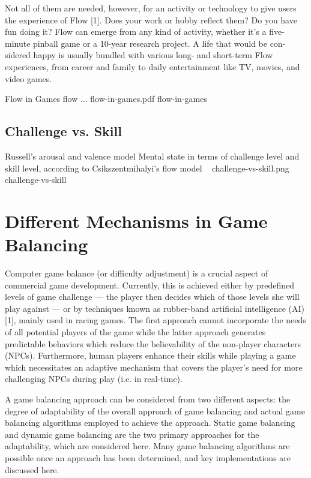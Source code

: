 \documentclass{uofsthesis-cs}
\begin{document}
 Not all of them are needed, however, for an activity or technology to give users the experience of Flow [1]. Does your work or hobby reflect them? Do you have fun doing it? Flow can emerge from any kind of activity, whether it’s a five-minute pinball game or a 10-year research project. A life that would be con- sidered happy is usually bundled with various long- and short-term Flow experiences, from career and family to daily entertainment like TV, movies, and video games. 

\img
{Flow in Games}
{flow ...}
{flow-in-games.pdf}
{flow-in-games}

\subsection{Challenge vs. Skill}

\img
{Russell's arousal and valence model}
{Mental state in terms of challenge level and skill level, according to Csikszentmihalyi's flow model ~\cite{csikszentmihalyi1997finding}}
{challenge-vs-skill.png}
{challenge-vs-skill}


\section{Different Mechanisms in Game Balancing}

Computer game balance (or difficulty adjustment) is a crucial aspect of commercial game development. Currently, this is achieved either by predefined levels of game challenge — the player then decides which of those levels she will play against — or by techniques known as rubber-band artificial intelligence (AI) [1], mainly used in racing games. The first approach cannot incorporate the needs of all potential players of the game while the latter approach generates predictable behaviors which reduce the believability of the non-player characters (NPCs). Furthermore, human players enhance their skills while playing a game which necessitates an adaptive mechanism that covers the player’s need for more challenging NPCs during play (i.e. in real-time).

A game balancing approach can be considered from two different aspects: the degree of adaptability of the overall approach of game balancing and actual game balancing algorithms employed to achieve the approach. Static game balancing and dynamic game balancing are the two primary approaches for the adaptability, which are considered here. Many game balancing algorithms are possible once an approach has been determined, and key implementations are discussed here.  
\end{document}
